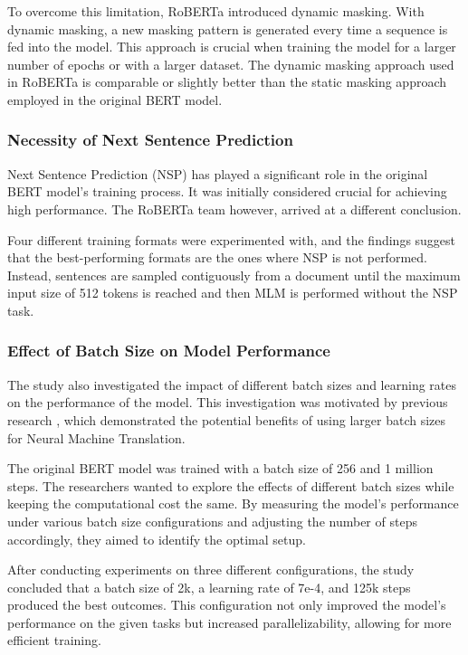 \documentclass[a4paper,10pt]{report}
\begin{document}
To overcome this limitation, RoBERTa introduced dynamic masking. With dynamic masking, a new masking pattern is generated every time a sequence is fed into the model. This approach is crucial when training the model for a larger number of epochs or with a larger dataset. The dynamic masking approach used in RoBERTa is comparable or slightly better than the static masking approach employed in the original BERT model. \cite{roberta}

\subsubsection{Necessity of Next Sentence Prediction}
Next Sentence Prediction (NSP) has played a significant role in the original BERT model's training process. It was initially considered crucial for achieving high performance. The RoBERTa team however, arrived at a different conclusion.

Four different training formats were experimented with, and the findings suggest that the best-performing formats are the ones where NSP is not performed. Instead, sentences are sampled contiguously from a document until the maximum input size of 512 tokens is reached and then MLM is performed without the NSP task. \cite{roberta}

\subsubsection{Effect of Batch Size on Model Performance}
The study also investigated the impact of different batch sizes and learning rates on the performance of the model. This investigation was motivated by previous research \cite{OttScaling}, which demonstrated the potential benefits of using larger batch sizes for Neural Machine Translation.

The original BERT model was trained with a batch size of 256 and 1 million steps. The researchers wanted to explore the effects of different batch sizes while keeping the computational cost the same. By measuring the model's performance under various batch size configurations and adjusting the number of steps accordingly, they aimed to identify the optimal setup.

After conducting experiments on three different configurations, the study concluded that a batch size of 2k, a learning rate of 7e-4, and 125k steps produced the best outcomes. This configuration not only improved the model's performance on the given tasks but increased parallelizability, allowing for more efficient training. \cite{roberta}
\end{document}
